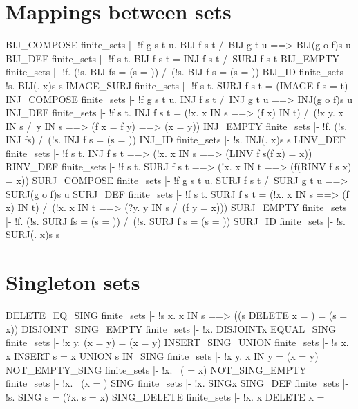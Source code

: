 \section{Mappings between sets}
\THEOREM BIJ\_COMPOSE finite\_sets
|- !f g s t u. BIJ f s t /\ BIJ g t u ==> BIJ(g o f)s u
\ENDTHEOREM
\THEOREM BIJ\_DEF finite\_sets
|- !f s t. BIJ f s t = INJ f s t /\ SURJ f s t
\ENDTHEOREM
\THEOREM BIJ\_EMPTY finite\_sets
|- !f. (!s. BIJ f{}s = (s = {})) /\ (!s. BIJ f s{} = (s = {}))
\ENDTHEOREM
\THEOREM BIJ\_ID finite\_sets
|- !s. BIJ(\x. x)s s
\ENDTHEOREM
\THEOREM IMAGE\_SURJ finite\_sets
|- !f s t. SURJ f s t = (IMAGE f s = t)
\ENDTHEOREM
\THEOREM INJ\_COMPOSE finite\_sets
|- !f g s t u. INJ f s t /\ INJ g t u ==> INJ(g o f)s u
\ENDTHEOREM
\THEOREM INJ\_DEF finite\_sets
|- !f s t.
    INJ f s t =
    (!x. x IN s ==> (f x) IN t) /\
    (!x y. x IN s /\ y IN s ==> (f x = f y) ==> (x = y))
\ENDTHEOREM
\THEOREM INJ\_EMPTY finite\_sets
|- !f. (!s. INJ f{}s) /\ (!s. INJ f s{} = (s = {}))
\ENDTHEOREM
\THEOREM INJ\_ID finite\_sets
|- !s. INJ(\x. x)s s
\ENDTHEOREM
\THEOREM LINV\_DEF finite\_sets
|- !f s t. INJ f s t ==> (!x. x IN s ==> (LINV f s(f x) = x))
\ENDTHEOREM
\THEOREM RINV\_DEF finite\_sets
|- !f s t. SURJ f s t ==> (!x. x IN t ==> (f(RINV f s x) = x))
\ENDTHEOREM
\THEOREM SURJ\_COMPOSE finite\_sets
|- !f g s t u. SURJ f s t /\ SURJ g t u ==> SURJ(g o f)s u
\ENDTHEOREM
\THEOREM SURJ\_DEF finite\_sets
|- !f s t.
    SURJ f s t =
    (!x. x IN s ==> (f x) IN t) /\
    (!x. x IN t ==> (?y. y IN s /\ (f y = x)))
\ENDTHEOREM
\THEOREM SURJ\_EMPTY finite\_sets
|- !f. (!s. SURJ f{}s = (s = {})) /\ (!s. SURJ f s{} = (s = {}))
\ENDTHEOREM
\THEOREM SURJ\_ID finite\_sets
|- !s. SURJ(\x. x)s s
\ENDTHEOREM
\section{Singleton sets}
\THEOREM DELETE\_EQ\_SING finite\_sets
|- !s x. x IN s ==> ((s DELETE x = {}) = (s = {x}))
\ENDTHEOREM
\THEOREM DISJOINT\_SING\_EMPTY finite\_sets
|- !x. DISJOINT{x}{}
\ENDTHEOREM
\THEOREM EQUAL\_SING finite\_sets
|- !x y. ({x} = {y}) = (x = y)
\ENDTHEOREM
\THEOREM INSERT\_SING\_UNION finite\_sets
|- !s x. x INSERT s = {x} UNION s
\ENDTHEOREM
\THEOREM IN\_SING finite\_sets
|- !x y. x IN {y} = (x = y)
\ENDTHEOREM
\THEOREM NOT\_EMPTY\_SING finite\_sets
|- !x. ~({} = {x})
\ENDTHEOREM
\THEOREM NOT\_SING\_EMPTY finite\_sets
|- !x. ~({x} = {})
\ENDTHEOREM
\THEOREM SING finite\_sets
|- !x. SING{x}
\ENDTHEOREM
\THEOREM SING\_DEF finite\_sets
|- !s. SING s = (?x. s = {x})
\ENDTHEOREM
\THEOREM SING\_DELETE finite\_sets
|- !x. {x} DELETE x = {}
\ENDTHEOREM
